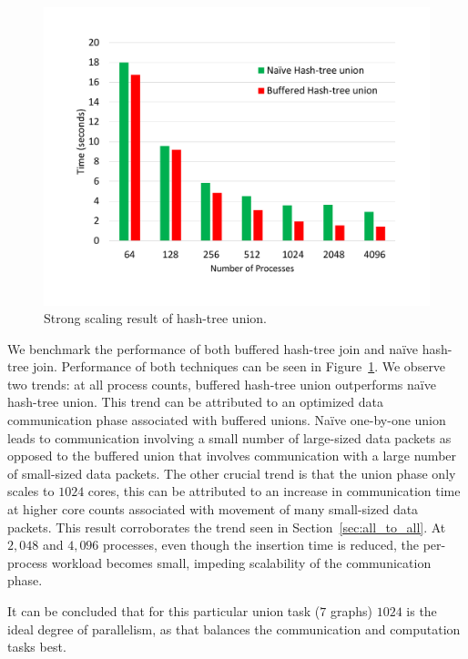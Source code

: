 \begin{figure}[h]
	\includegraphics[width=\columnwidth]{results/hash_tree_union.pdf}
	\caption{Strong scaling result of hash-tree union.}
	\label{fig:dist_union}
\end{figure}

We benchmark the performance of both buffered hash-tree join and na\"ive hash-tree join. 
Performance of both techniques can be seen in Figure~\ref{fig:dist_union}. We observe two trends: at all process counts, buffered hash-tree union outperforms na\"ive hash-tree union. This trend can be attributed to an optimized data communication phase associated with buffered unions. Na\"ive one-by-one union leads to communication involving a small number of large-sized data packets as opposed to the buffered union that involves communication with a large number of small-sized data packets. 
The other crucial trend is that the union phase only scales to $1024$ cores, this can be attributed to an increase in communication time at higher core counts associated with movement of many small-sized data packets. This result corroborates the trend seen in Section~\ref{sec:all_to_all}. At $2,\!048$ and $4,\!096$ processes, even though the insertion time is reduced, the per-process workload becomes small, impeding scalability of the communication phase. 

It can be concluded that for this particular union task ($7$ graphs) $1024$ is the ideal degree of parallelism, as that balances the communication and computation tasks best.


